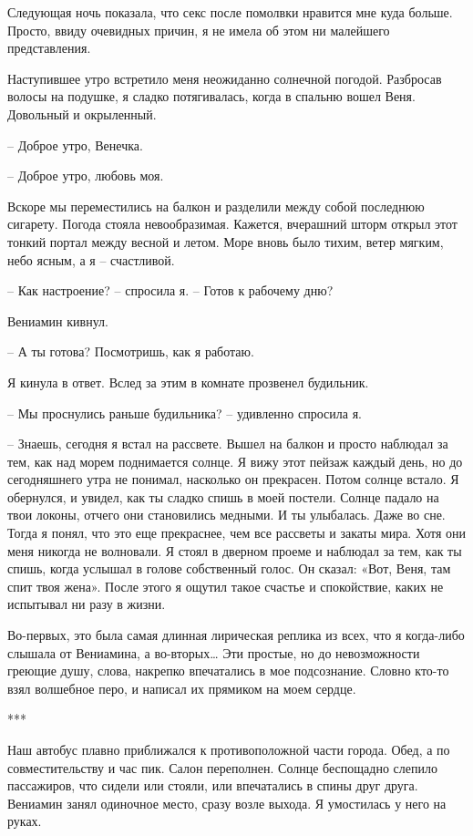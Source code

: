 \documentclass[
]{book}
\begin{document}
Следующая ночь показала, что секс после помолвки нравится мне куда больше. Просто, ввиду очевидных причин, я не имела об этом ни малейшего представления.

Наступившее утро встретило меня неожиданно солнечной погодой. Разбросав волосы на подушке, я сладко потягивалась, когда в спальню вошел Веня. Довольный и окрыленный.

-- Доброе утро, Венечка.

-- Доброе утро, любовь моя.

Вскоре мы переместились на балкон и разделили между собой последнюю сигарету. Погода стояла невообразимая. Кажется, вчерашний шторм открыл этот тонкий портал между весной и летом. Море вновь было тихим, ветер мягким, небо ясным, а я -- счастливой.

-- Как настроение? -- спросила я. -- Готов к рабочему дню?

Вениамин кивнул.

-- А ты готова? Посмотришь, как я работаю.

Я кинула в ответ. Вслед за этим в комнате прозвенел будильник.

-- Мы проснулись раньше будильника? -- удивленно спросила я.

-- Знаешь, сегодня я встал на рассвете. Вышел на балкон и просто наблюдал за тем, как над морем поднимается солнце. Я вижу этот пейзаж каждый день, но до сегодняшнего утра не понимал, насколько он прекрасен. Потом солнце встало. Я обернулся, и увидел, как ты сладко спишь в моей постели. Солнце падало на твои локоны, отчего они становились медными. И ты улыбалась. Даже во сне. Тогда я понял, что это еще прекраснее, чем все рассветы и закаты мира. Хотя они меня никогда не волновали. Я стоял в дверном проеме и наблюдал за тем, как ты спишь, когда услышал в голове собственный голос. Он сказал: «Вот, Веня, там спит твоя жена». После этого я ощутил такое счастье и спокойствие, каких не испытывал ни разу в жизни.

Во-первых, это была самая длинная лирическая реплика из всех, что я когда-либо слышала от Вениамина, а во-вторых\ldots{} Эти простые, но до невозможности греющие душу, слова, накрепко впечатались в мое подсознание. Словно кто-то взял волшебное перо, и написал их прямиком на моем сердце.

***

Наш автобус плавно приближался к противоположной части города. Обед, а по совместительству и час пик. Салон переполнен. Солнце беспощадно слепило пассажиров, что сидели или стояли, или впечатались в спины друг друга. Вениамин занял одиночное место, сразу возле выхода. Я умостилась у него на руках.
\end{document}
